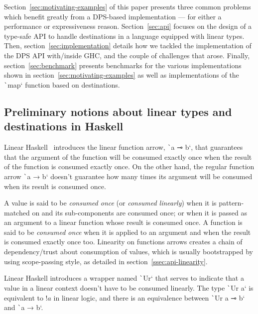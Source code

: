 \documentclass[english]{jflart}
\begin{document}
Section~\ref{sec:motivating-examples} of this paper presents three common problems which benefit greatly from a DPS-based implementation --- for either a performance or expressiveness reason. Section~\ref{sec:api} focuses on the design of a type-safe API to handle destinations in a language equipped with linear types. Then, section~\ref{sec:implementation} details how we tackled the implementation of the DPS API with/inside GHC, and the couple of challenges that arose. Finally, section~\ref{sec:benchmark} presents benchmarks for the various implementations shown in section~\ref{sec:motivating-examples} as well as implementations of the \texttt`map` function based on destinations.

\subsection{Preliminary notions about linear types and destinations in Haskell}\label{ssec:intro-linearity}

Linear Haskell~\cite{bernardy_linear_2018} introduces the linear function arrow, \texttt`a ⊸ b`, that guarantees that the argument of the function will be consumed exactly once when the result of the function is consumed exactly once. On the other hand, the regular function arrow \texttt`a → b` doesn't guarantee how many times its argument will be consumed when its result is consumed once.

A value is said to be \emph{consumed once} (or \emph{consumed linearly}) when it is pattern-matched on and its sub-components are consumed once; or when it is passed as an argument to a linear function whose result is consumed once. A function is said to be \emph{consumed once} when it is applied to an argument and when the result is consumed exactly once too. Linearity on functions arrows creates a chain of dependency/trust about consumption of values, which is usually bootstrapped by using scope-passing style, as detailed in section~\ref{ssec:api-linearity}.

Linear Haskell introduces a wrapper named \texttt`Ur` that serves to indicate that a value in a linear context doesn't have to be consumed linearly. The type \texttt`Ur a` is equivalent to $!a$ in linear logic, and there is an equivalence between \texttt`Ur a ⊸ b` and \texttt`a → b`.
\end{document}
